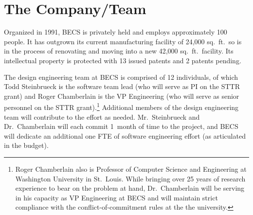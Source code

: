 \section{The Company/Team}
\label{sec:team}

%

Organized in 1991, BECS is privately held and employs approximately 100
people. It has outgrown its current
manufacturing facility of 24,000 sq.~ft.\ so is in the process of
renovating and moving into a new 42,000 sq.~ft.\ facility.
Its intellectual property is protected with 13 issued patents and
2 patents pending.

The design engineering team at BECS is comprised of 12 individuals, of
which Todd Steinbrueck is the software team lead (who will serve as
PI on the STTR grant) and Roger Chamberlain is the VP Engineering (who
will serve as senior personnel on the STTR grant).\footnote{Roger Chamberlain
also is Professor of Computer Science and Engineering at Washington
University in St.~Louis. While bringing over 25 years of research
experience to bear on the problem at hand, Dr.~Chamberlain will be
serving in his capacity as VP Engineering at BECS and will maintain
strict compliance with the conflict-of-commitment rules at the the university.}
Additional members of the design engineering team will contribute to
the effort as needed. Mr.~Steinbrueck and Dr.~Chamberlain will each
commit 1~month of time to the project, and BECS will dedicate an additional
one FTE of software engineering effort (as articulated in the budget).

